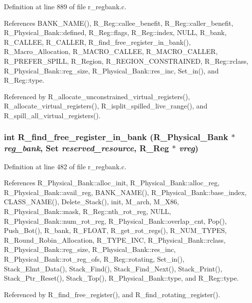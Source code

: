 Definition at line 889 of file r\_\-regbank.c.

References BANK\_\-NAME(), R\_\-Reg::callee\_\-benefit, R\_\-Reg::caller\_\-benefit, R\_\-Physical\_\-Bank::defined, R\_\-Reg::flags, R\_\-Reg::index, NULL, R\_\-bank, R\_\-CALLEE, R\_\-CALLER, R\_\-find\_\-free\_\-register\_\-in\_\-bank(), R\_\-Macro\_\-Allocation, R\_\-MACRO\_\-CALLEE, R\_\-MACRO\_\-CALLER, R\_\-PREFER\_\-SPILL, R\_\-Region, R\_\-REGION\_\-CONSTRAINED, R\_\-Reg::rclass, R\_\-Physical\_\-Bank::reg\_\-size, R\_\-Physical\_\-Bank::res\_\-inc, Set\_\-in(), and R\_\-Reg::type.

Referenced by R\_\-allocate\_\-unconstrained\_\-virtual\_\-registers(), R\_\-allocate\_\-virtual\_\-registers(), R\_\-isplit\_\-spilled\_\-live\_\-range(), and R\_\-spill\_\-all\_\-virtual\_\-registers().
\subsubsection{\setlength{\rightskip}{0pt plus 5cm}int R\_\-find\_\-free\_\-register\_\-in\_\-bank (\bf{R\_\-Physical\_\-Bank} $\ast$ {\em reg\_\-bank}, \bf{Set} {\em reserved\_\-resource}, \bf{R\_\-Reg} $\ast$ {\em vreg})}\label{r__regbank_8c_62906af2907a84336bb2f9fcf3afd920}




Definition at line 482 of file r\_\-regbank.c.

References R\_\-Physical\_\-Bank::alloc\_\-init, R\_\-Physical\_\-Bank::alloc\_\-reg, R\_\-Physical\_\-Bank::avail\_\-reg, BANK\_\-NAME(), R\_\-Physical\_\-Bank::base\_\-index, CLASS\_\-NAME(), Delete\_\-Stack(), init, M\_\-arch, M\_\-X86, R\_\-Physical\_\-Bank::mask, R\_\-Reg::nth\_\-rot\_\-reg, NULL, R\_\-Physical\_\-Bank::num\_\-rot\_\-reg, R\_\-Physical\_\-Bank::overlap\_\-cnt, Pop(), Push\_\-Bot(), R\_\-bank, R\_\-FLOAT, R\_\-get\_\-rot\_\-regs(), R\_\-NUM\_\-TYPES, R\_\-Round\_\-Robin\_\-Allocation, R\_\-TYPE\_\-INC, R\_\-Physical\_\-Bank::rclass, R\_\-Physical\_\-Bank::reg\_\-size, R\_\-Physical\_\-Bank::res\_\-inc, R\_\-Physical\_\-Bank::rot\_\-reg\_\-ofs, R\_\-Reg::rotating, Set\_\-in(), Stack\_\-Elmt\_\-Data(), Stack\_\-Find(), Stack\_\-Find\_\-Next(), Stack\_\-Print(), Stack\_\-Ptr\_\-Reset(), Stack\_\-Top(), R\_\-Physical\_\-Bank::type, and R\_\-Reg::type.

Referenced by R\_\-find\_\-free\_\-register(), and R\_\-find\_\-rotating\_\-register().
